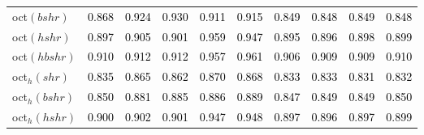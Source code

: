 \begin{tabular}[t]{l|ccccccccc}
oct$(bshr)$ & \textcolor{black}{0.868} & \textcolor{black}{0.924} & \textcolor{black}{0.930} & \textcolor{black}{0.911} & \textcolor{black}{0.915} & \textcolor{black}{0.849} & \textcolor{black}{0.848} & \textcolor{black}{0.849} & \textcolor{black}{0.848}\\
oct$(hshr)$ & \textcolor{black}{0.897} & \textcolor{black}{0.905} & \textcolor{black}{0.901} & \textcolor{black}{0.959} & \textcolor{black}{0.947} & \textcolor{black}{0.895} & \textcolor{black}{0.896} & \textcolor{black}{0.898} & \textcolor{black}{0.899}\\
oct$(hbshr)$ & \textcolor{black}{0.910} & \textcolor{black}{0.912} & \textcolor{black}{0.912} & \textcolor{black}{0.957} & \textcolor{black}{0.961} & \textcolor{black}{0.906} & \textcolor{black}{0.909} & \textcolor{black}{0.909} & \textcolor{black}{0.910}\\
oct$_h(shr)$ & \textcolor{black}{0.835} & \textcolor{black}{0.865} & \textcolor{black}{0.862} & \textcolor{black}{0.870} & \textcolor{black}{0.868} & \textcolor{black}{0.833} & \textcolor{black}{0.833} & \textcolor{black}{0.831} & \textcolor{black}{0.832}\\
oct$_h(bshr)$ & \textcolor{black}{0.850} & \textcolor{black}{0.881} & \textcolor{black}{0.885} & \textcolor{black}{0.886} & \textcolor{black}{0.889} & \textcolor{black}{0.847} & \textcolor{black}{0.849} & \textcolor{black}{0.849} & \textcolor{black}{0.850}\\
oct$_h(hshr)$ & \textcolor{black}{0.900} & \textcolor{black}{0.902} & \textcolor{black}{0.901} & \textcolor{black}{0.947} & \textcolor{black}{0.948} & \textcolor{black}{0.897} & \textcolor{black}{0.896} & \textcolor{black}{0.897} & \textcolor{black}{0.899}\\
\bottomrule
\end{tabular}
